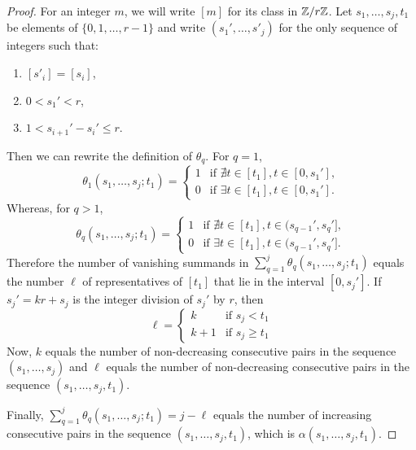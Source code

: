 \begin{proof}
	For an integer $m$, we will write $[m]$ for its class in $\mathbb{Z}/r\mathbb{Z}$. Let $s_1,\ldots,s_j,t_1$ be elements of $\{0,1,\ldots,r-1\}$ and write $(s_1',\dots,s'_j)$ for the only sequence of integers such that:
	\begin{enumerate}
		\item $[s'_i] = [s_i]$,
		\item $0< s_1'< r$,
		\item $1 < s_{i+1}' - s_i' \leq r$.
	\end{enumerate}
	Then we can rewrite the definition of $\theta_q$.
	For $q = 1$,
	\[
	\theta_1(s_1,\ldots,s_j;t_1) =
	\begin{cases}
		1 & \text{if $\nexists t\in [t_1], t\in [0,s_1']$}, \\
		0 & \text{if $\exists t\in [t_1], t\in [0,s_1']$}.
	\end{cases}
	\]
	Whereas, for $q > 1$,
	\[
	\theta_q(s_1,\ldots,s_j;t_1) =
	\begin{cases}
		1 & \text{if $\nexists t\in [t_1], t\in (s_{q-1}',s_q']$}, \\
		0 & \text{if $\exists t\in [t_1], t\in (s_{q-1}',s_q']$}.
	\end{cases}
	\]
	Therefore the number of vanishing summands in $\sum_{q=1}^j\theta_q(s_1,\dots,s_j;t_1)$ equals the number $\ell$ of representatives of $[t_1]$ that lie in the interval $[0,s_j']$. If $s_j'=kr+s_j$ is the integer division of $s_j'$ by $r$, then
	\[
	\ell = \begin{cases}
		k & \text{if $s_j<t_1$} \\
		k+1 & \text{if $s_j\geq t_1$}
	\end{cases}
	\]
	Now, $k$ equals the number of non-decreasing consecutive pairs in the sequence $(s_1,\ldots,s_j)$ and $\ell$ equals the number of non-decreasing consecutive pairs in the sequence $(s_1,\ldots,s_j,t_1)$.

	Finally, $\sum_{q=1}^j\theta_q(s_1,\dots,s_j;t_1) = j-\ell$ equals the number of increasing consecutive pairs in the sequence $(s_1,\ldots,s_j,t_1)$, which is $\alpha(s_1,\dots,s_j,t_1)$.
\end{proof}